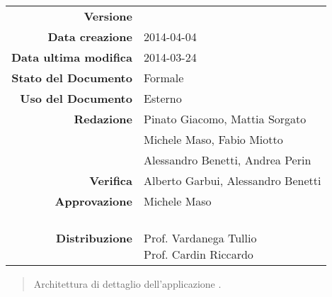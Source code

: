 


\newcommand{\Versione}{\versioneDefinizioneDiProdotto{}} %
\newcommand{\Data}{2014-04-04}				           	 %
\newcommand{\DataUltimaModifica}{2014-03-24}
\newcommand{\TipoDocumento}{Definizione di Prodotto}	 %



\begin{center}
\begin{tabular}{r|l}
\textbf{Versione} & \Versione{} \\
\textbf{Data creazione} & \Data{} \\
\textbf{Data ultima modifica} & \DataUltimaModifica{} \\
\textbf{Stato del Documento} & Formale \\		          %
\textbf{Uso del Documento} & Esterno \\			          %
\textbf{Redazione} &  Pinato Giacomo, Mattia Sorgato\\	  %
& Michele Maso, Fabio Miotto\\
& Alessandro Benetti, Andrea Perin\\
\textbf{Verifica} & Alberto Garbui, Alessandro Benetti\\  %
\textbf{Approvazione} & Michele Maso\\				      %
\textbf{Distribuzione} & \parbox[t]{4cm}{\NomeGruppo{}\\Prof. Vardanega Tullio\\Prof. Cardin Riccardo\\ \Prop{} }\\
\end{tabular}
\end{center}

\vspace{0.05in}

\begin{abstract}
\begin{center}
Architettura di dettaglio dell'applicazione \Progetto{}.
\end{center}
\end{abstract}

